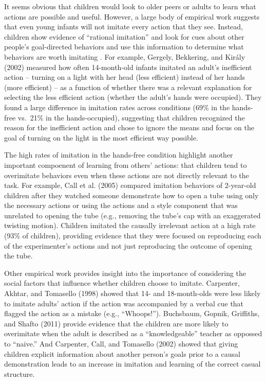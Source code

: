 \documentclass[english,floatsintext,man]{apa6}
\theoremstyle{definition}
\theoremstyle{definition}
\theoremstyle{definition}
\theoremstyle{remark}
\begin{document}
It seems obvious that children would look to older peers or adults to
learn what actions are possible and useful. However, a large body of
empirical work suggests that even young infants will not imitate every
action that they see. Instead, children show evidence of
\enquote{rational imitation} and look for cues about other people's
goal-directed behaviors and use this information to determine what
behaviors are worth imitating . For example, Gergely, Bekkering, and
Király (2002) measured how often 14-month-old infants imitated an
adult's inefficient action -- turning on a light with her head (less
efficient) instead of her hands (more efficient) -- as a function of
whether there was a relevant explanation for selecting the less
efficient action (whether the adult's hands were occupied). They found a
large difference in imitation rates across conditions (69\% in the
hands-free vs.~21\% in the hands-occupied), suggesting that children
recognized the reason for the inefficient action and chose to ignore the
means and focus on the goal of turning on the light in the most
efficient way possible.

The high rates of imitation in the hands-free condition highlight
another important compoenent of learning from others' actions: that
children tend to overimitate behaviors even when these actions are not
directly relevant to the task. For example, Call et al. (2005) compared
imitation behaviors of 2-year-old children after they watched someone
demonstrate how to open a tube using only the necessary actions or using
the actions and a style component that was unrelated to opening the tube
(e.g., removing the tube's cap with an exaggerated twisting motion).
Children imitated the causally irrelevant action at a high rate (93\% of
children), providing evidence that they were focused on reproducing each
of the experimenter's actions and not just reproducing the outcome of
opening the tube.

Other empirical work provides insight into the importance of considering
the social factors that influence whether children choose to imitate.
Carpenter, Akhtar, and Tomasello (1998) showed that 14- and
18-month-olds were less likely to imitate adults' action if the action
was accompanied by a verbal cue that flagged the action as a mistake
(e.g., \enquote{Whoops!}). Buchsbaum, Gopnik, Griffiths, and Shafto
(2011) provide evidence that the children are more likely to overimitate
when the adult is described as a \enquote{knowledgeable} teacher as
oppossed to \enquote{naive.} And Carpenter, Call, and Tomasello (2002)
showed that giving children explicit information about another person's
goals prior to a causal demonstration leads to an increase in imitation
and learning of the correct casual structure.
\end{document}
